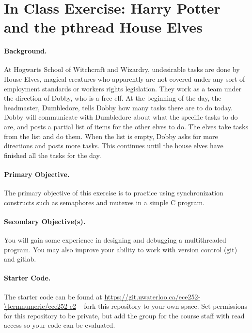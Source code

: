 




\section*{In Class Exercise: Harry Potter and the pthread House Elves}

\paragraph{Background.}
At Hogwarts School of Witchcraft and Wizardry, undesirable tasks are done by House
Elves, magical creatures who apparently are not covered under any sort of employment
standards or workers rights legislation. They work as a team under the direction of
Dobby, who is a free elf. At the beginning of the day, the headmaster, Dumbledore, tells Dobby how many tasks there are to do today. Dobby will communicate with Dumbledore about what the specific tasks to do are, and posts a partial list of items for the other elves to do. The elves take tasks from the list and do them. When the list is empty, Dobby asks for more directions and posts more tasks. This continues until the house elves have finished all the tasks for the day.

\paragraph{Primary Objective.} The primary objective of this exercise is to practice using synchronization constructs such as semaphores and mutexes in a simple C program.

\paragraph{Secondary Objective(s).} You will gain some experience in designing and debugging a multithreaded program. You may also improve your ability to work with version control (git) and gitlab.

\paragraph{Starter Code.} The starter code can be found at \url{https://git.uwaterloo.ca/ece252-\termnumeric/ece252-e2} -- fork this repository to your own space. Set permissions for this repository to be private, but add the group for the course staff with read access so your code can be evaluated.

